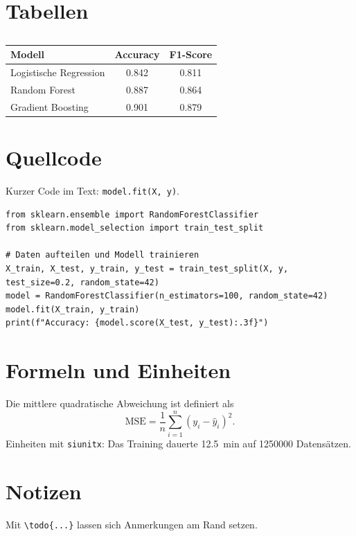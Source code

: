 \section{Tabellen}
\begin{table}[htbp]
  \centering
  \caption{}
  \label{tab:metriken}
  \begin{tabular}{lSS}
    \toprule
    {Modell} & {Accuracy} & {F1-Score} \\
    \midrule
    Logistische Regression & 0.842 & 0.811 \\
    Random Forest          & 0.887 & 0.864 \\
    Gradient Boosting      & 0.901 & 0.879 \\
    \bottomrule
  \end{tabular}
\end{table}

\section{Quellcode}
Kurzer Code im Text: \lstinline|model.fit(X, y)|.

\begin{lstlisting}[caption={\DeEn{Training eines Modells mit scikit-learn}{Training a model with scikit-learn}}, label={lst:sklearn}]
from sklearn.ensemble import RandomForestClassifier
from sklearn.model_selection import train_test_split

# Daten aufteilen und Modell trainieren
X_train, X_test, y_train, y_test = train_test_split(X, y, test_size=0.2, random_state=42)
model = RandomForestClassifier(n_estimators=100, random_state=42)
model.fit(X_train, y_train)
print(f"Accuracy: {model.score(X_test, y_test):.3f}")
\end{lstlisting}

\section{Formeln und Einheiten}
Die mittlere quadratische Abweichung ist definiert als
\begin{equation}
  \mathrm{MSE} = \frac{1}{n} \sum_{i=1}^{n} \left( y_i - \hat{y}_i \right)^2 .
  \label{eq:mse}
\end{equation}
Einheiten mit \texttt{siunitx}: Das Training dauerte \SI{12.5}{\minute} auf
\num{1250000} Datensätzen.

\section{Notizen}
Mit \verb|\todo{...}| lassen sich Anmerkungen am Rand setzen.
